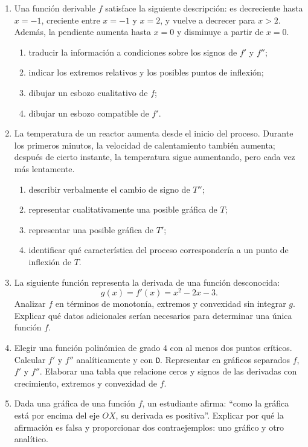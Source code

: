 \begin{enumerate}[label=\textbf{\arabic*.},leftmargin=*]
\item Una función derivable $f$ satisface la siguiente descripción: es decreciente hasta $x=-1$, creciente entre $x=-1$ y $x=2$, y vuelve a decrecer para $x>2$. Además, la pendiente aumenta hasta $x=0$ y disminuye a partir de $x=0$.
\begin{enumerate}[label=\alph*)]
\item traducir la información a condiciones sobre los signos de $f'$ y $f''$;
\item indicar los extremos relativos y los posibles puntos de inflexión;
\item dibujar un esbozo cualitativo de $f$;
\item dibujar un esbozo compatible de $f'$.
\end{enumerate}

\item La temperatura de un reactor aumenta desde el inicio del proceso. Durante los primeros minutos, la velocidad de calentamiento también aumenta; después de cierto instante, la temperatura sigue aumentando, pero cada vez más lentamente.
\begin{enumerate}[label=\alph*)]
\item describir verbalmente el cambio de signo de $T''$;
\item representar cualitativamente una posible gráfica de $T$;
\item representar una posible gráfica de $T'$;
\item identificar qué característica del proceso correspondería a un punto de inflexión de $T$.
\end{enumerate}

\item La siguiente función representa la derivada de una función desconocida:
\[
g(x)=f'(x)=x^2-2x-3.
\]
Analizar $f$ en términos de monotonía, extremos y convexidad sin integrar $g$. Explicar qué datos adicionales serían necesarios para determinar una única función $f$.

\item \M Elegir una función polinómica de grado $4$ con al menos dos puntos críticos. Calcular $f'$ y $f''$ analíticamente y con \texttt{D}. Representar en gráficos separados $f$, $f'$ y $f''$. Elaborar una tabla que relacione ceros y signos de las derivadas con crecimiento, extremos y convexidad de $f$.

\item Dada una gráfica de una función $f$, un estudiante afirma: ``como la gráfica está por encima del eje $OX$, su derivada es positiva''. Explicar por qué la afirmación es falsa y proporcionar dos contraejemplos: uno gráfico y otro analítico.


\end{enumerate}
